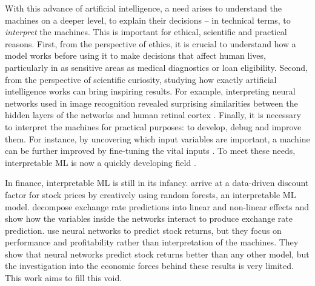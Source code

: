 With this advance of artificial intelligence, a need arises to understand the machines on a deeper level, to explain their decisions -- in technical terms, to \textit{interpret} the machines. This is important for ethical, scientific and practical reasons. First, from the perspective of ethics, it is crucial to understand how a model works before using it to make decisions that affect human lives, particularly in as sensitive areas as medical diagnostics or loan eligibility. Second, from the perspective of scientific curiosity, studying how exactly artificial intelligence works can bring inspiring results. For example, interpreting neural networks used in image recognition revealed surprising similarities between the hidden layers of the networks and human retinal cortex \citep{olah2017feature}. Finally, it is necessary to interpret the machines for practical purposes: to develop, debug and improve them. For instance, by uncovering which input variables are important, a machine can be further improved by fine-tuning the vital inputs \citep{de2018advances}. To meet these needs, interpretable ML is now a quickly developing field \citep{molnar2020interpretable}. 

In finance, interpretable ML is still in its infancy. \cite{bryzgalova2019forest} arrive at a data-driven discount factor for stock prices by creatively using random forests, an interpretable ML model. \cite{li2020beyond} decompose exchange rate predictions into linear and non-linear effects and show how the variables inside the networks interact to produce exchange rate prediction. \cite{gu2020empirical, tobek2020does} use neural networks to predict stock returns, but they focus on performance and profitability rather than interpretation of the machines. They show that neural networks predict stock returns better than any other model, but the investigation into the economic forces behind these  results is very limited. This work aims to fill this void. 

